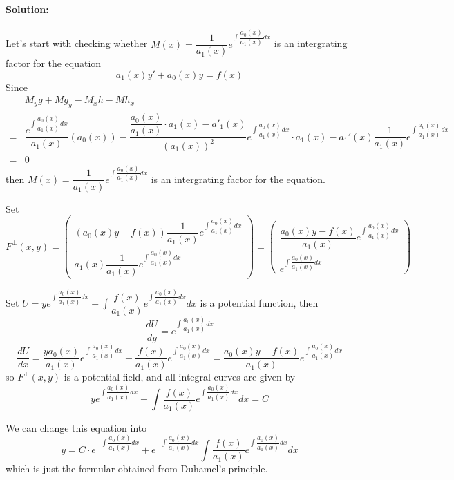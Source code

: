 \documentclass[a4paper,12pt,titlepage]{article}
\begin{document}
\section{}
\paragraph{Solution:}Let's start with checking whether $M(x)=\dfrac{1}{a_1(x)}e^{\int\dfrac{a_0(x)}{a_1(x)}dx}$ is an intergrating factor for the equation
$$a_1(x)y'+a_0(x)y=f(x)$$
Since
\begin{align*}
&M_yg+Mg_y-M_xh-Mh_x\\
=&\dfrac{e^{\int\dfrac{a_0(x)}{a_1(x)}dx}}{a_1(x)}(a_0(x))-\dfrac{\dfrac{a_0(x)}{a_1(x)}\cdot a_1(x)-a'_1(x)}{(a_1(x))^2}e^{\int\dfrac{a_0(x)}{a_1(x)}dx}\cdot a_1(x)-a_1'(x)\dfrac{1}{a_1(x)}e^{\int\dfrac{a_0(x)}{a_1(x)}dx}\\
=&0
\end{align*}
then 
$M(x)=\dfrac{1}{a_1(x)}e^{\int\dfrac{a_0(x)}{a_1(x)}dx}$ is an intergrating factor for the equation.

Set
$$F^{\perp}(x,y)=\begin{pmatrix}
(a_0(x)y-f(x))\dfrac{1}{a_1(x)}e^{\int\dfrac{a_0(x)}{a_1(x)}dx}\\a_1(x)\dfrac{1}{a_1(x)}e^{\int\dfrac{a_0(x)}{a_1(x)}dx}\end{pmatrix}=\begin{pmatrix}
\dfrac{a_0(x)y-f(x)}{a_1(x)}e^{\int\dfrac{a_0(x)}{a_1(x)}dx}\\e^{\int\dfrac{a_0(x)}{a_1(x)}dx}\end{pmatrix}$$

Set $U=ye^{\int\dfrac{a_0(x)}{a_1(x)}dx}-\int \dfrac{f(x)}{a_1(x)}e^{\int\dfrac{a_0(x)}{a_1(x)}dx}dx$ is a potential function, then
$$\dfrac{dU}{dy}=e^{\int\dfrac{a_0(x)}{a_1(x)}dx}$$
$$\dfrac{dU}{dx}=\dfrac{ya_0(x)}{a_1(x)}e^{\int\dfrac{a_0(x)}{a_1(x)}dx}-\dfrac{f(x)}{a_1(x)}e^{\int\dfrac{a_0(x)}{a_1(x)}dx}=\dfrac{a_0(x)y-f(x)}{a_1(x)}e^{\int\dfrac{a_0(x)}{a_1(x)}dx}$$
so $F^{\perp}(x,y)$ is a potential field, and all integral curves are given by 
$$ye^{\int\dfrac{a_0(x)}{a_1(x)}dx}-\int \dfrac{f(x)}{a_1(x)}e^{\int\dfrac{a_0(x)}{a_1(x)}dx}dx=C$$

We can change this equation into  
$$y=C\cdot e^{-\int\dfrac{a_0(x)}{a_1(x)}dx}+e^{-\int\dfrac{a_0(x)}{a_1(x)}dx}\int \dfrac{f(x)}{a_1(x)}e^{\int\dfrac{a_0(x)}{a_1(x)}dx}dx$$
which is just the formular obtained from Duhamel's principle.
\end{document}
